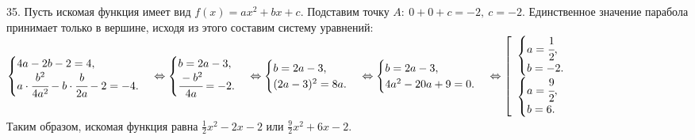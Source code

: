 35. Пусть искомая функция имеет вид $f(x)=ax^2+bx+c.$ Подставим точку $A:\ 0+0+c=-2,\ c=-2.$ Единственное значение парабола принимает только в вершине, исходя из этого составим систему уравнений:
$\begin{cases} 4a-2b-2=4,\\ a\cdot\cfrac{b^2}{4a^2}-b\cdot\cfrac{b}{2a}-2=-4.\end{cases}\Leftrightarrow
\begin{cases} b=2a-3,\\ \cfrac{-b^2}{4a}=-2.\end{cases}\Leftrightarrow
\begin{cases} b=2a-3,\\ (2a-3)^2=8a.\end{cases}\Leftrightarrow
\begin{cases} b=2a-3,\\ 4a^2-20a+9=0.\end{cases}\Leftrightarrow
\left[\begin{array}{l}\begin{cases} a=\cfrac{1}{2},\\ b=-2.\end{cases}\\\begin{cases} a=\cfrac{9}{2},\\ b=6.\end{cases}\end{array}\right.$\\
Таким образом, искомая функция равна $\frac{1}{2}x^2-2x-2$ или $\frac{9}{2}x^2+6x-2.$\\
